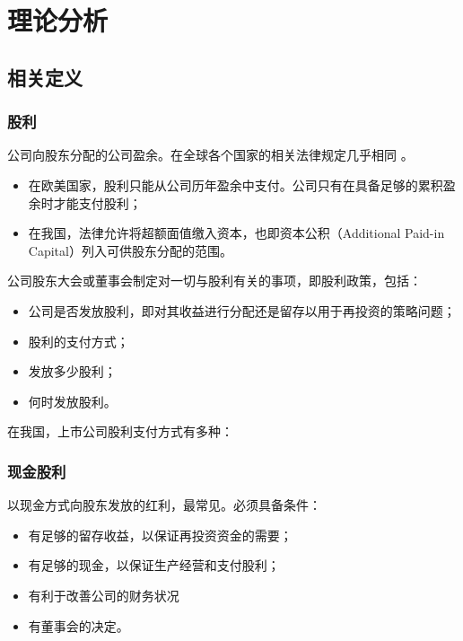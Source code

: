 \documentclass[../main]{subfiles}
\begin{document}
\chapter{理论分析}%
\label{cha:theorem}

\section{相关定义}%
\label{sec:definition}

\subsection{股利}%
\label{sec:dividend}

公司向股东分配的公司盈余。在全球各个国家的相关法律规定几乎相同
。\cite{孔小文2003上市公司股利政策信号传递效应的实证分析}

\begin{itemize}
  \item 在欧美国家，股利只能从公司历年盈余中支付。公司只有在具备足够的累积盈
    余时才能支付股利；
  \item 在我国，法律允许将超额面值缴入资本，也即资本公积（Additional Paid-in
    Capital）列入可供股东分配的范围。
\end{itemize}

公司股东大会或董事会制定对一切与股利有关的事项，即股利政策，包括：

\begin{itemize}
  \item 公司是否发放股利，即对其收益进行分配还是留存以用于再投资的策略问题；
  \item 股利的支付方式；
  \item 发放多少股利；
  \item 何时发放股利。
\end{itemize}

在我国，上市公司股利支付方式有多种：

\subsection{现金股利}%
\label{sub:cash_dividend}

以现金方式向股东发放的红利，最常见。必须具备条件：

\begin{itemize}
  \item 有足够的留存收益，以保证再投资资金的需要；
  \item 有足够的现金，以保证生产经营和支付股利；
  \item 有利于改善公司的财务状况
  \item 有董事会的决定。
\end{itemize}
\end{document}
